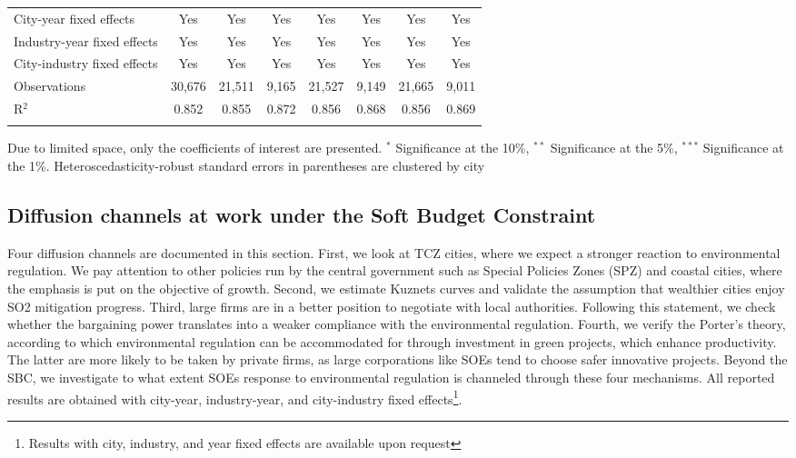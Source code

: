\documentclass[12pt]{article}
\begin{document}
\begin{table}[!htb]
\begin{adjustbox}{width=\textwidth, totalheight=\baselineskip,keepaspectratio}
\begin{tabular}{@{\extracolsep{5pt}}lccccccc}
City-year fixed effects & Yes & Yes & Yes & Yes & Yes & Yes & Yes \\ 
Industry-year fixed effects & Yes & Yes & Yes & Yes & Yes & Yes & Yes \\ 
City-industry fixed effects & Yes & Yes & Yes & Yes & Yes & Yes & Yes \\ 
Observations & 30,676 & 21,511 & 9,165 & 21,527 & 9,149 & 21,665 & 9,011 \\ 
R$^{2}$ & 0.852 & 0.855 & 0.872 & 0.856 & 0.868 & 0.856 & 0.869 \\ 
\hline 
\hline \\[-1.8ex] 
\end{tabular}
\end{adjustbox}
\begin{tablenotes} 
 \small 
 \item 
\footnotesize{
Due to limited space, only the coefficients of interest are presented. $^{*}$ Significance at the 10\%, $^{**}$ Significance at the 5\%, $^{***}$ Significance at the 1\%. Heteroscedasticity-robust standard errors in parentheses are clustered by city 
}
 
\end{tablenotes}
\end{table}

\subsection{Diffusion channels at work under the Soft Budget Constraint} \label{diffusion}




Four diffusion channels are documented in this section. First, we look at TCZ cities, where we expect a stronger reaction to environmental regulation. We pay attention to other policies run by the central government such as Special Policies Zones (SPZ) and coastal cities, where the emphasis is put on the objective of growth. Second, we estimate Kuznets curves and validate the assumption that wealthier cities enjoy SO2 mitigation progress. Third, large firms are in a better position to negotiate with local authorities. Following this statement, we check whether the bargaining power translates into a weaker compliance with the environmental regulation. Fourth, we verify the Porter’s theory, according to which environmental regulation can be accommodated for through investment in green projects, which enhance productivity. The latter are more likely to be taken by private firms, as large corporations like SOEs tend to choose safer innovative projects. Beyond the SBC, we investigate to what extent SOEs response to environmental regulation is channeled through these four mechanisms. All reported results are obtained with city-year, industry-year, and city-industry fixed effects\footnote{Results with city, industry, and year fixed effects are available upon request}. 
\end{document}
